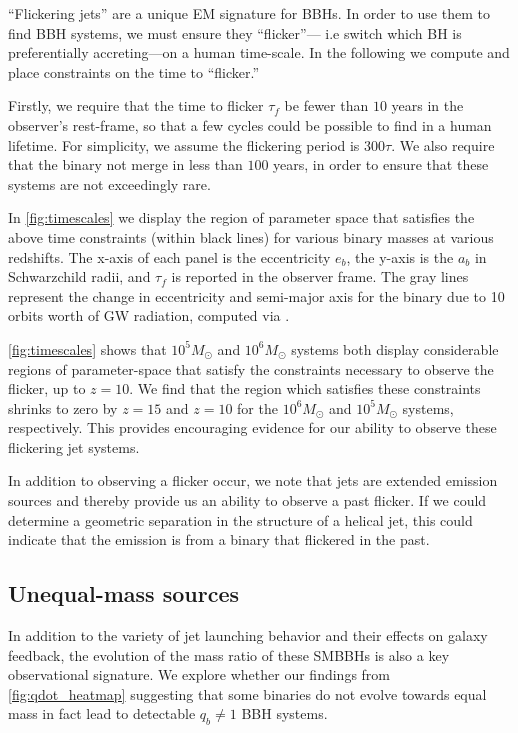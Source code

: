 \documentclass[fleqn,usenatbib]{mnras}
\begin{document}
``Flickering jets'' are a unique EM signature for BBHs. In order to use them to find BBH systems, we must ensure they ``flicker''--- i.e switch which BH is preferentially accreting---on a human time-scale. In the following we compute  and place constraints on the time to ``flicker.''

Firstly, we require that the time to flicker $\tau_f$ be fewer than $10$ years in the observer's rest-frame, so that a few cycles could be possible to find in a human lifetime. For simplicity, we assume the flickering period is $300 \tau$. We also require that the binary not merge in less than $100$ years, in order to ensure that these systems are not exceedingly rare. 

In \autoref{fig:timescales} we display the region of parameter space that satisfies the above time constraints (within black lines) for various binary masses at various redshifts. The x-axis of each panel is the eccentricity $e_b$, the y-axis is the $a_b$ in Schwarzchild radii, and $\tau_f$ is reported in the observer frame. The gray lines represent the change in eccentricity and semi-major axis for the binary due to 10 orbits worth of GW radiation, computed via \citealt{peters_64}.

\autoref{fig:timescales} shows that $10^5M_\odot$ and $10^6M_\odot$ systems both display considerable regions of parameter-space that satisfy the constraints necessary to observe the flicker, up to $z=10$. We find that the region which satisfies these constraints shrinks to zero by $z=15$ and $z=10$ for the $10^6M_\odot$ and $10^5M_\odot$ systems, respectively. This provides encouraging evidence for our ability to observe these flickering jet systems.

In addition to observing a flicker occur, we note that jets are extended emission sources and thereby provide us an ability to observe a past flicker. If we could determine a geometric separation in the structure of a helical jet, this could indicate that the emission is from a binary that flickered in the past. 


\subsection{Unequal-mass sources}
In addition to the variety of jet launching behavior and their effects on galaxy feedback, the evolution of the mass ratio of these SMBBHs is also a key observational signature. We explore whether our findings from \autoref{fig:qdot_heatmap} suggesting that some binaries do not evolve towards equal mass in fact lead to detectable $q_{b} \neq 1$ BBH systems.
\end{document}
